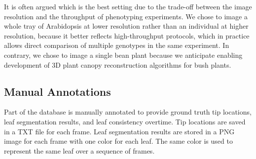 
It is often argued which is the best setting due to the trade-off between the image resolution and the throughput of phenotyping experiments.
We chose to image a whole tray of Arabidopsis at lower resolution rather than an individual at higher resolution, because it better reflects high-throughput protocols, which in practice allows direct comparison of multiple genotypes in the same experiment.
In contrary, we chose to image a single bean plant because we anticipate enabling development of $3$D plant canopy reconstruction algorithms for bush plants.


\subsection{Manual Annotations}
Part of the database is manually annotated to provide ground truth tip locations, leaf segmentation results, and leaf consistency overtime.
Tip locations are saved in a TXT file for each frame.
Leaf segmentation results are stored in a PNG image for each frame with one color for each leaf.
The same color is used to represent the same leaf over a sequence of frames.

